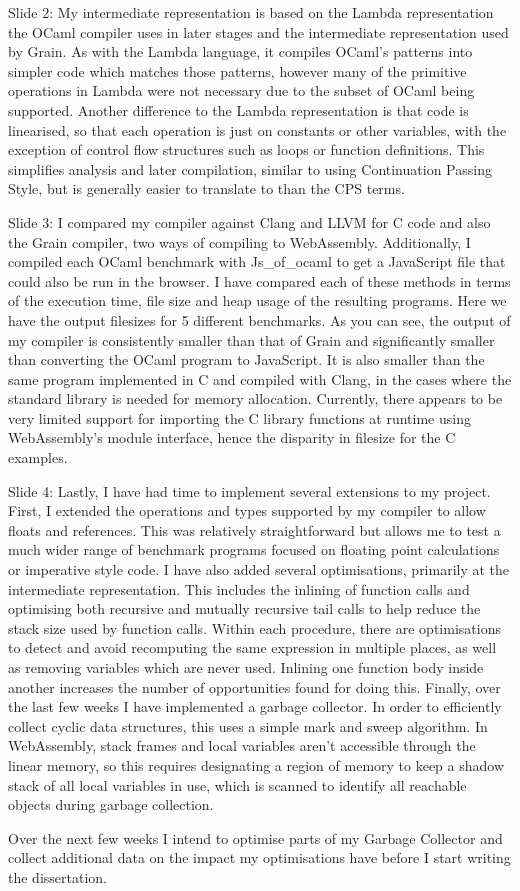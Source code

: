 \documentclass{beamer}
\begin{document}
Slide 2: My intermediate representation is based on the Lambda representation the OCaml compiler uses in later stages and the intermediate representation used by Grain. As with the Lambda language, it compiles OCaml's patterns into simpler code which matches those patterns, however many of the primitive operations in Lambda were not necessary due to the subset of OCaml being supported. Another difference to the Lambda representation is that code is linearised, so that each operation is just on constants or other variables, with the exception of control flow structures such as loops or function definitions. This simplifies analysis and later compilation, similar to using Continuation Passing Style, but is generally easier to translate to than the CPS terms.

Slide 3: I compared my compiler against Clang and LLVM for C code and also the Grain compiler,  two ways of compiling to WebAssembly. Additionally, I compiled each OCaml benchmark with Js_of_ocaml to get a JavaScript file that could also be run in the browser.
I have compared each of these methods in terms of the execution time, file size and heap usage of the resulting programs. Here we have the output filesizes for 5 different benchmarks. As you can see, the output of my compiler is consistently smaller than that of Grain and significantly smaller than converting the OCaml program to JavaScript. 
It is also smaller than the same program implemented in C and compiled with Clang, in the cases where the standard library is needed for memory allocation.
Currently, there appears to be very limited support for importing the C library functions at runtime using WebAssembly's module interface, hence the disparity in filesize for the C examples.

Slide 4: Lastly, I have had time to implement several extensions to my project. First, I extended the operations and types supported by my compiler to allow floats and references. This was relatively straightforward but allows me to test a much wider range of benchmark programs focused on floating point calculations or imperative style code.
I have also added several optimisations, primarily at the intermediate representation. This includes the inlining of function calls and optimising both recursive and mutually recursive tail calls to help reduce the stack size used by function calls.
Within each procedure, there are optimisations to detect and avoid recomputing the same expression in multiple places, as well as removing variables which are never used. Inlining one function body inside another increases the number of opportunities found for doing this.
Finally, over the last few weeks I have implemented a garbage collector. In order to efficiently collect cyclic data structures, this uses a simple mark and sweep algorithm. In WebAssembly, stack frames and local variables aren't accessible through the linear memory, so this requires designating a region of memory to keep a shadow stack of all local variables in use, which is scanned to identify all reachable objects during garbage collection.

Over the next few weeks I intend to optimise parts of my Garbage Collector and collect additional data on the impact my optimisations have before I start writing the dissertation.

\fi
\end{document}
